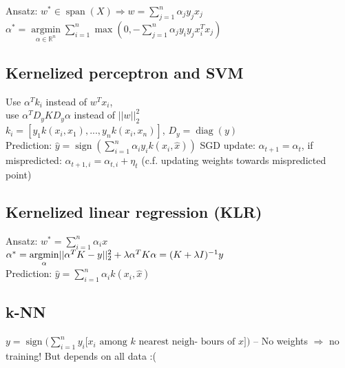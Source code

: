 Ansatz: $w^* \in \operatorname{span}(X) \Rightarrow w = \sum_{j=1}^n \alpha_j y_j x_j$\\
$\alpha^*= \underset{\alpha \in \mathbb{R}^n}{\operatorname{argmin}} \sum_{i=1}^n \operatorname{max}(0, - \sum_{j=1}^n \alpha_j y_i y_j x_i^T x_j)$

\subsection*{Kernelized perceptron and SVM}
Use $\alpha^T k_i$ instead of $w^T x_i$,\\
use $\alpha^T D_y K D_y \alpha$ instead of $||w||_2^2$\\ 
$k_i=[y_1 k(x_i,x_1), ..., y_n k(x_i,x_n)]$, $D_y = \operatorname{diag}(y)$\\
Prediction: $\hat{y} = \operatorname{sign}(\sum_{i=1}^n \alpha_i y_i k(x_i, \hat{x}))$
SGD update: $\alpha_{t+1} = \alpha_t$, if mispredicted: $\alpha_{t+1,i} = \alpha_{t,i} + \eta_t$ (c.f. updating weights towards mispredicted point)

\subsection*{Kernelized linear regression (KLR)}
Ansatz: $w^*=\sum_{i = 1}^n \alpha_i x$\\
$\alpha^*= \underset{\alpha}{\operatorname{argmin}} ||\alpha^T K - y||_2^2 + \lambda \alpha^T K \alpha \\= (K+\lambda I)^{-1} y$\\
Prediction: $\hat{y} = \sum \limits_{i=1}^n \alpha_i k(x_i,\hat{x})$

\subsection*{k-NN}
$y = \operatorname{sign} \big( \sum_{i=1}^n y_i [x_i \text{ among } k \text{ nearest neigh-}$ $\text{bours of } x] \big)$ --
No weights $\Rightarrow$ no training! But depends on all data :(